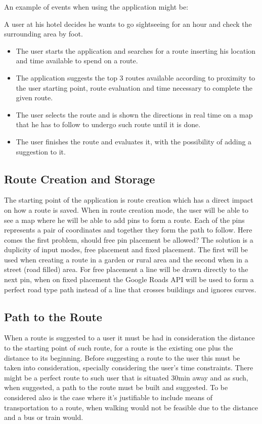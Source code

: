 \documentclass{article}
\begin{document}
        An example of events when using the application might be:

        A user at his hotel decides he wants to go sightseeing for an hour and check the surrounding area by foot.
    
        \begin{itemize}  
            \item The user starts the application and searches for a route inserting his location and time available to spend on a route.
            \item The application suggests the top 3 routes available according to proximity to the user starting point, route evaluation and time necessary to complete the given route. 
            \item The user selects the route and is shown the directions in real time on a map that he has to follow to undergo such route until it is done.
            \item The user finishes the route and evaluates it, with the possibility of adding a suggestion to it. 
        \end{itemize}
        
        \subsection*{Route Creation and Storage}
            The starting point of the application is route creation which has a direct impact on how a route is saved. When in route creation mode, the user
            will be able to see a map where he will be able to add pins to form a route. Each of the pins represents a pair of coordinates and together
            they form the path to follow. Here comes the first problem, should free pin placement be allowed? The solution is a duplicity of input modes, 
            free placement and fixed placement. The first will be used when creating a route in a garden or rural area and the second when in a street (road filled) area. 
            For free placement a line will be drawn directly to the next pin, when on fixed placement the Google Roads API will be used to form a perfect road 
            type path instead of a line that crosses buildings and ignores curves.

        \subsection*{Path to the Route}
            When a route is suggested to a user it must be had in consideration the distance to the starting point of such route, for a route
            is the existing one plus the distance to its beginning. Before suggesting a route to the user this must be taken into consideration,
            specially considering the user's time constraints. There might be a perfect route to such user that is situated 30min away and 
            as such, when suggested, a path to the route must be built and suggested. To be considered also is the case where it's justifiable 
            to include means of transportation to a route, when walking would not be feasible due to the distance and a bus or train would.
        
\end{document}

